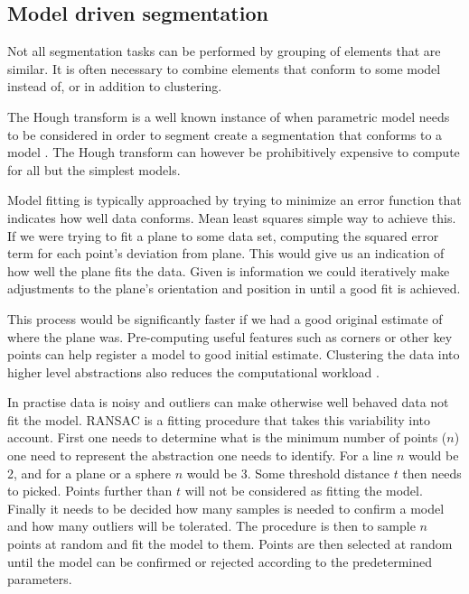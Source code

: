 




\subsection{Model driven segmentation}

Not all segmentation tasks can be performed by grouping of elements that are similar. It is often necessary to combine elements that conform to some model instead of, or in addition to clustering.

The Hough transform is a well known instance of when parametric model needs to be considered in order to segment create a segmentation that conforms to a model \cite{Ballard1981}. The Hough transform can however be prohibitively expensive to compute for all but the simplest models.

Model fitting is typically approached by trying to minimize an error function that indicates how well data conforms. Mean least squares simple way to achieve this. If we were trying to fit a plane to some data set, computing the squared error term for each point's deviation from plane. This would give us an indication of how well the plane fits the data. Given is information we could iteratively make adjustments to the plane's orientation and position in until a good fit is achieved.

This process would be significantly faster if we had a good original estimate of where the plane was. Pre-computing useful features such as corners or other key points can help register a model to good initial estimate. Clustering the data into higher level abstractions also reduces the computational workload .

In practise data is noisy and outliers can make otherwise well behaved data not fit the model. RANSAC \cite{Fischler1981} is a fitting procedure that takes this variability into account. First one needs to determine what is the minimum number of points ($n$) one need to represent the abstraction one needs to identify. For a line $n$ would be 2, and for a plane or a sphere $n$ would be 3. Some threshold distance $t$ then needs to picked. Points further than $t$ will not be considered as fitting the model. Finally it needs to be decided how many samples is needed to confirm a model and how many outliers will be tolerated. The procedure is then to sample $n$ points at random and fit the model to them. Points are then selected at random until the model can be confirmed or rejected according to the predetermined parameters.

